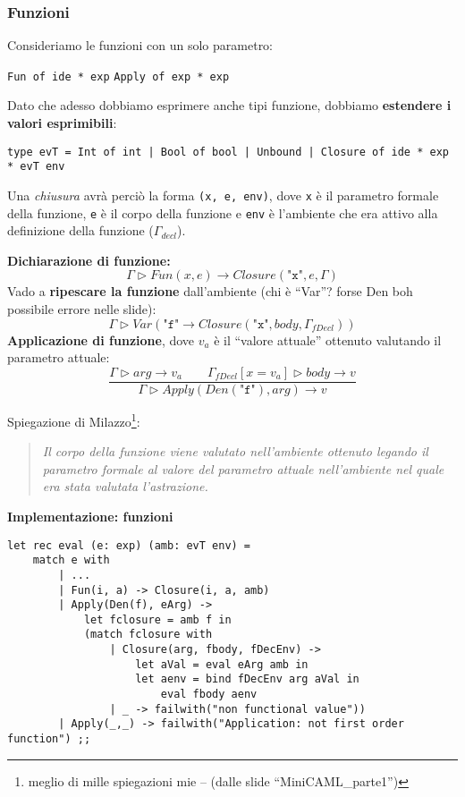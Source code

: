\documentclass[a4paper,10pt]{article}
\begin{document}
\subsubsection{Funzioni}
Consideriamo le funzioni con un solo parametro:
\begin{center}
\texttt{Fun of ide * exp} \quad\quad \texttt{Apply of exp * exp}
\end{center}

Dato che adesso dobbiamo esprimere anche tipi funzione, dobbiamo \textbf{estendere i valori esprimibili}:
\label{closure}
\begin{lstlisting}
type evT = Int of int | Bool of bool | Unbound | Closure of ide * exp * evT env
\end{lstlisting}

Una \emph{chiusura} avrà perciò la forma \texttt{(x, e, env)}, dove \texttt x è il parametro formale della funzione, \texttt e è il corpo della funzione e \texttt{env} è l'ambiente che era attivo alla definizione della funzione ($\Gamma_{decl}$).\medskip

\textbf{Dichiarazione di funzione:}
\[ \Gamma \triangleright Fun (x, e) \to Closure (\texttt{"x"}, e, \Gamma) \]
Vado a \textbf{ripescare la funzione} dall'ambiente (chi è ``Var''? forse Den boh possibile errore nelle slide):
\[ \Gamma \triangleright Var (\texttt{"f"} \to Closure(\texttt{"x"}, body, \Gamma_{fDecl}))\]
\textbf{Applicazione di funzione}, dove $v_a$ è il ``valore attuale'' ottenuto valutando il parametro attuale:
\[ \dfrac{\Gamma \triangleright arg \to v_a\quad \quad \Gamma_{fDecl}[x = v_a] \triangleright body \to v}{\Gamma \triangleright Apply(Den(\texttt{"f"}), arg) \to v} \]

Spiegazione di Milazzo\footnote{meglio di mille spiegazioni mie -- (dalle slide ``MiniCAML\_parte1'')}:

\begin{quote}\it
 Il corpo della funzione viene valutato nell’ambiente
ottenuto legando il parametro formale al valore del parametro
attuale nell’ambiente nel quale era stata valutata l’astrazione.
\end{quote}

\newpage
\textbf {Implementazione: funzioni}
\begin{lstlisting}
let rec eval (e: exp) (amb: evT env) =
    match e with
        | ...
        | Fun(i, a) -> Closure(i, a, amb)
        | Apply(Den(f), eArg) ->
            let fclosure = amb f in
            (match fclosure with
                | Closure(arg, fbody, fDecEnv) ->
                    let aVal = eval eArg amb in
                    let aenv = bind fDecEnv arg aVal in
                        eval fbody aenv
                | _ -> failwith("non functional value"))
        | Apply(_,_) -> failwith("Application: not first order function") ;;
\end{lstlisting}
\end{document}
